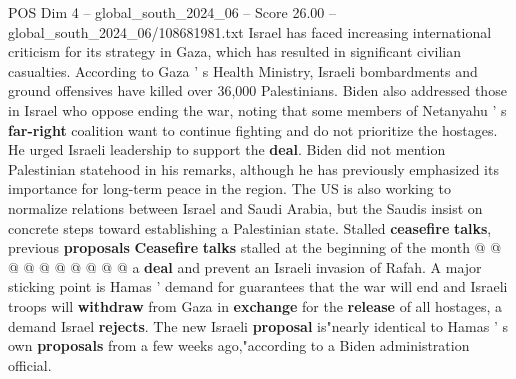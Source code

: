 \begin{textsample}{POS Dim 4 – global\_south\_2024\_06 – Score 26.00 – global\_south\_2024\_06/108681981.txt}
Israel has faced increasing international criticism for its strategy in Gaza, which has resulted in significant civilian casualties.
According to Gaza ' s Health Ministry, Israeli bombardments and ground offensives have killed over 36,000 Palestinians.
Biden also addressed those in Israel who oppose ending the war, noting that some members of Netanyahu ' s \textbf{far-right} coalition want to continue fighting and do not prioritize the hostages.
He urged Israeli leadership to support the \textbf{deal}.
Biden did not mention Palestinian statehood in his remarks, although he has previously emphasized its importance for long-term peace in the region.
The US is also working to normalize relations between Israel and Saudi Arabia, but the Saudis insist on concrete steps toward establishing a Palestinian state.
Stalled \textbf{ceasefire} \textbf{talks}, previous \textbf{proposals} \textbf{Ceasefire} \textbf{talks} stalled at the beginning of the month @ @ @ @ @ @ @ @ @ @ a \textbf{deal} and prevent an Israeli invasion of Rafah.
A major sticking point is Hamas ' demand for guarantees that the war will end and Israeli troops will \textbf{withdraw} from Gaza in \textbf{exchange} for the \textbf{release} of all hostages, a demand Israel \textbf{rejects}.
The new Israeli \textbf{proposal} is"nearly identical to Hamas ' s own \textbf{proposals} from a few weeks ago,"according to a Biden administration official.

\end{textsample}
